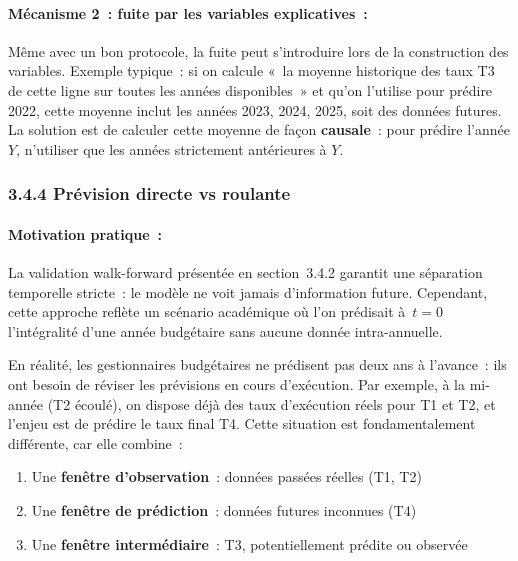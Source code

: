 \paragraph{Mécanisme 2~: fuite par les variables explicatives~:}

Même avec un bon protocole, la fuite peut s'introduire lors de la construction des
variables. Exemple typique~: si on calcule «~la moyenne historique des taux T3 de
cette ligne sur toutes les années disponibles~» et qu'on l'utilise pour prédire 2022,
cette moyenne inclut les années 2023, 2024, 2025, soit des données futures. La solution
est de calculer cette moyenne de façon \textbf{causale}~: pour prédire l'année $Y$,
n'utiliser que les années strictement antérieures à $Y$.

\subsubsection*{3.4.4 \quad Prévision directe vs roulante}

\paragraph{Motivation pratique~:}

La validation walk-forward présentée en section~3.4.2 garantit une séparation temporelle
stricte~: le modèle ne voit jamais d'information future. Cependant, cette approche
reflète un scénario académique où l'on prédisait à~$t=0$ l'intégralité d'une année
budgétaire sans aucune donnée intra-annuelle.

En réalité, les gestionnaires budgétaires ne prédisent pas deux ans à l'avance~: ils
ont besoin de réviser les prévisions en cours d'exécution. Par exemple, à la mi-année
(T2 écoulé), on dispose déjà des taux d'exécution réels pour T1 et T2, et l'enjeu est
de prédire le taux final T4. Cette situation est fondamentalement différente, car elle
combine~:
\begin{enumerate}
  \item Une \textbf{fenêtre d'observation}~: données passées réelles (T1, T2)
  \item Une \textbf{fenêtre de prédiction}~: données futures inconnues (T4)
  \item Une \textbf{fenêtre intermédiaire}~: T3, potentiellement prédite ou observée
\end{enumerate}

